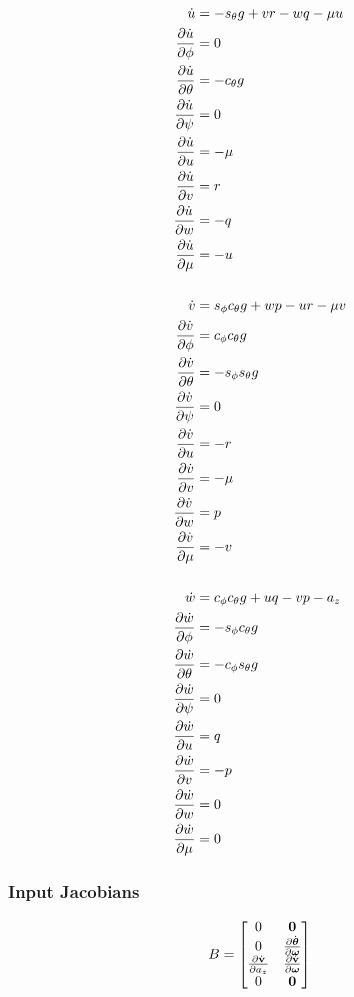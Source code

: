 \begin{align*}
  \dot{u} &= -s_\theta g + vr - wq - \mu u \\
  \frac{\partial \dot{u}}{\partial \phi} &= 0 \\
  \frac{\partial \dot{u}}{\partial \theta} &= -c_\theta g \\
  \frac{\partial \dot{u}}{\partial \psi} &= 0 \\
  \frac{\partial \dot{u}}{\partial u} &= -\mu \\
  \frac{\partial \dot{u}}{\partial v} &= r \\
  \frac{\partial \dot{u}}{\partial w} &= -q \\
  \frac{\partial \dot{u}}{\partial \mu} &= -u \\
  \\
  \dot{v} &= s_\phi c_\theta g + wp - ur - \mu v \\
  \frac{\partial \dot{v}}{\partial \phi} &= c_\phi c_\theta g \\
  \frac{\partial \dot{v}}{\partial \theta} &= -s_\phi s_\theta g \\
  \frac{\partial \dot{v}}{\partial \psi} &= 0 \\
  \frac{\partial \dot{v}}{\partial u} &= -r \\
  \frac{\partial \dot{v}}{\partial v} &= -\mu \\
  \frac{\partial \dot{v}}{\partial w} &= p \\
  \frac{\partial \dot{v}}{\partial \mu} &= -v \\
  \\
  \dot{w} &= c_\phi c_\theta g + uq - vp - a_z \\
  \frac{\partial \dot{w}}{\partial \phi} &= -s_\phi c_\theta g \\
  \frac{\partial \dot{w}}{\partial \theta} &= -c_\phi s_\theta g \\
  \frac{\partial \dot{w}}{\partial \psi} &= 0 \\
  \frac{\partial \dot{w}}{\partial u} &= q \\
  \frac{\partial \dot{w}}{\partial v} &= -p \\
  \frac{\partial \dot{w}}{\partial w} &= 0 \\
  \frac{\partial \dot{w}}{\partial \mu} &= 0 \\
\end{align*}

\subsubsection{Input Jacobians}
\begin{equation}
  B =
  \begin{bmatrix}
    0 & \boldsymbol{\mathrm{0}} \\
    0 & \frac{\partial \dot{\boldsymbol{\mathrm{\theta}}}}{\partial \boldsymbol{\mathrm{\omega}}} \\
    \frac{\partial \dot{\boldsymbol{\mathrm{v}}}}{\partial a_z} & \frac{\partial
      \dot{\boldsymbol{\mathrm{v}}}}{\partial \boldsymbol{\mathrm{\omega}}} \\
    0 & \boldsymbol{\mathrm{0}} 
  \end{bmatrix}
\end{equation}

